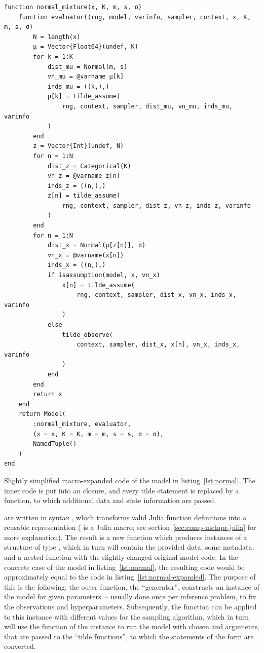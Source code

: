 \begin{lstfloat}
  \begin{lstlisting}[style=lstfloat]
function normal_mixture(x, K, m, s, σ)
    function evaluator((rng, model, varinfo, sampler, context, x, K, m, s, σ)
        N = length(x)
        μ = Vector{Float64}(undef, K)
        for k = 1:K
            dist_mu = Normal(m, s)
            vn_mu = @varname μ[k]
            inds_mu = ((k,),)
            μ[k] = tilde_assume(
                rng, context, sampler, dist_mu, vn_mu, inds_mu, varinfo
            )
        end
        z = Vector{Int}(undef, N)
        for n = 1:N
            dist_z = Categorical(K)
            vn_z = @varname z[n]
            inds_z = ((n,),)
            z[n] = tilde_assume(
                rng, context, sampler, dist_z, vn_z, inds_z, varinfo
            )
        end
        for n = 1:N
            dist_x = Normal(μ[z[n]], σ)
            vn_x = @varname(x[n])
            inds_x = ((n,),)
            if isassumption(model, x, vn_x)
                x[n] = tilde_assume(
                    rng, context, sampler, dist_x, vn_x, inds_x, varinfo
                )
            else
                tilde_observe(
                    context, sampler, dist_x, x[n], vn_x, inds_x, varinfo
                )
            end
        end
        return x
    end
    return Model(
        :normal_mixture, evaluator, 
        (x = x, K = K, m = m, s = s, σ = σ), 
        NamedTuple()
    )
end
\end{lstlisting}
  \caption{Slightly simplified macro-expanded code of the model in listing~\ref{lst:normal}.  The
    inner code is put into an \protect{} closure, and every tilde statement is
    replaced by a \protect{} function, to which additional data and state information
    are passed.\label{lst:normal-expanded}}
\end{lstfloat}
\setlength{\parskip}{0pt}

 are written in \dppljl{} syntax \parencite{tarek2020dynamicppl},
which transforms valid Julia function definitions into a reusable representation ( is
a Julia macro; see section~\ref{sec:comp-metapr-julia} for more explanation).  The result is a new
function which produces instances of a structure of type , which in turn will contain
the provided data, some metadata, and a nested function with the slightly changed original model
code. In the concrete case of the model in listing~\ref{lst:normal}, the resulting code would be
approximately equal to the code in listing~\ref{lst:normal-expanded}.  The purpose of this is the
following: the outer function, the \enquote{generator}, constructs an instance of the model for
given parameters~-- usually done once per inference problem, to fix the observations and
hyperparameters.  Subsequently, the  function can be applied to this instance with
different values for the sampling algorithm, which in turn will use the  function
of the instance to run the model with chosen  and  arguments, that are
passed to the \enquote{tilde functions}, to which the statements of the form  are
converted.

